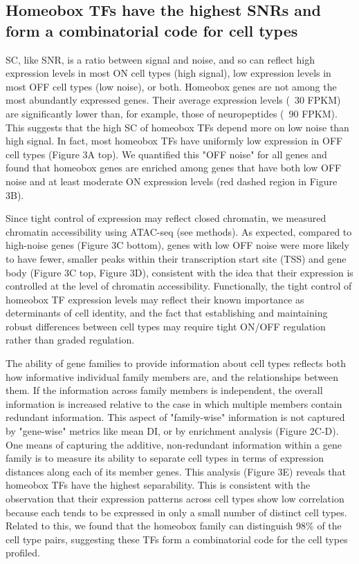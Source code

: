 \subsection{Homeobox TFs have the highest SNRs and form a combinatorial code for cell types}
SC, like SNR, is a ratio between signal and noise, and so can reflect high expression levels in most ON cell types (high signal), low expression levels in most OFF cell types (low noise), or both. Homeobox genes are not among the most abundantly expressed genes. Their average expression levels (~30 FPKM) are significantly lower than, for example, those of neuropeptides (~90 FPKM). This suggests that the high SC of homeobox TFs depend more on low noise than high signal. In fact, most homeobox TFs have uniformly low expression in OFF cell types (Figure 3A top). We quantified this "OFF noise" for all genes and found that homeobox genes are enriched among genes that have both low OFF noise and at least moderate ON expression levels (red dashed region in Figure 3B).

Since tight control of expression may reflect closed chromatin, we measured chromatin accessibility using ATAC-seq (see methods). As expected, compared to high-noise genes (Figure 3C bottom), genes with low OFF noise were more likely to have fewer, smaller peaks within their transcription start site (TSS) and gene body (Figure 3C top, Figure 3D), consistent with the idea that their expression is controlled at the level of chromatin accessibility. Functionally, the tight control of homeobox TF expression levels may reflect their known importance as determinants of cell identity, and the fact that establishing and maintaining robust differences between cell types may require tight ON/OFF regulation rather than graded regulation.

The ability of gene families to provide information about cell types reflects both how informative individual family members are, and the relationships between them. If the information across family members is independent, the overall information is increased relative to the case in which multiple members contain redundant information. This aspect of "family-wise" information is not captured by "gene-wise" metrics like mean DI, or by enrichment analysis (Figure 2C-D). One means of capturing the additive, non-redundant information within a gene family is to measure its ability to separate cell types in terms of expression distances along each of its member genes. This analysis (Figure 3E) reveals that homeobox TFs have the highest separability. This is consistent with the observation that their expression patterns across cell types show low correlation because each tends to be expressed in only a small number of distinct cell types. Related to this, we found that the homeobox family can distinguish 98\% of the cell type pairs, suggesting these TFs form a combinatorial code for the cell types profiled. 

